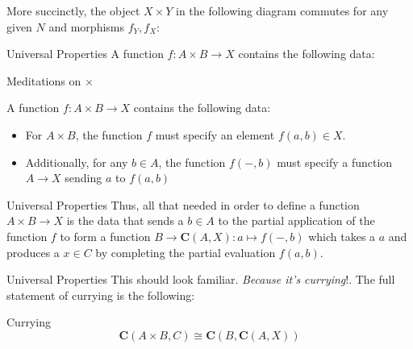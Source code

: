 \documentclass[tikz]{beamer}
\theoremstyle{definition}
\begin{document}
\begin{frame}[fragile]
More succinctly, the object $X \times Y$ in the following diagram commutes for any given $N$ and morphisms $f_Y, f_X$: 
    
\begin{center}
    {}
\end{center}{}

\end{frame}

\begin{frame}{Universal Properties}
    A function $f: A \times B \to X$ contains the following data: 
\end{frame}{}

\begin{frame}{Meditations on $\times$}

    A function $f: A \times B \to X$ contains the following data: 
    \begin{block}{}
    
        \begin{itemize}
            \item For $A \times B$, the function $f$ must specify an element $f(a,b) \in X$.
            
            \item Additionally, for any $b \in A$, the function $f(-,b)$ must specify a function $A \to X$ sending $a$ to $f(a,b)$
        \end{itemize}{}
    \end{block}{}
\end{frame}{}

\begin{frame}{Universal Properties}
    Thus, all that needed in order to define a function $A \times B \to X$ is the data that sends a $b \in A$ to the partial application of the function $f$ to form a function $B \to \mathbf{C}(A, X): a \mapsto f(-,b)$ which takes a $a$ and produces a $x \in C$ by completing the partial evaluation $f(a,b)$.
\end{frame}{}

\begin{frame}{Universal Properties}
    This should look familiar. \textit{Because it's currying}!. The full statement of currying is the following:
    
\begin{block}{Currying}
\begin{equation*}
    \mathbf{C}(A \times B, C) \cong \mathbf{C}(B, \mathbf{C}(A, X))
\end{equation*}{}
\end{block}{}
\end{frame}
\end{document}
